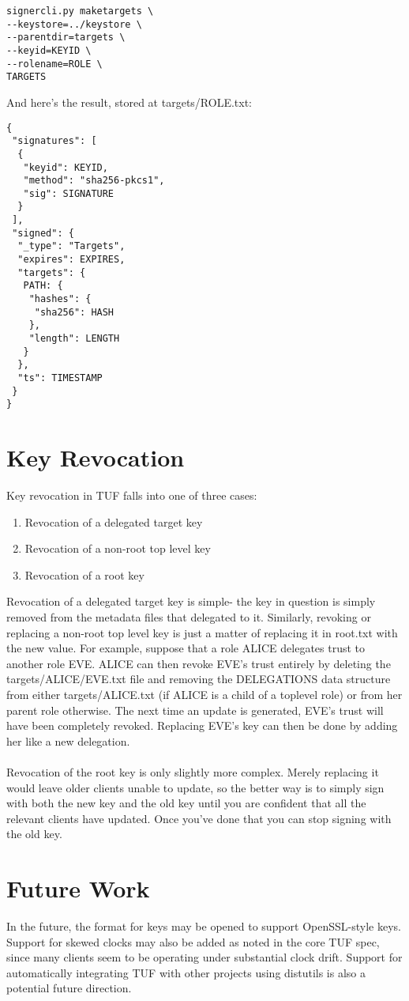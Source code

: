 \documentclass{letter}
\begin{document}
\begin{lstlisting}
signercli.py maketargets \
--keystore=../keystore \
--parentdir=targets \
--keyid=KEYID \
--rolename=ROLE \
TARGETS
\end{lstlisting}

And here's the result, stored at targets/ROLE.txt:

\begin{verbatim}
{
 "signatures": [
  {
   "keyid": KEYID, 
   "method": "sha256-pkcs1", 
   "sig": SIGNATURE
  }
 ], 
 "signed": {
  "_type": "Targets", 
  "expires": EXPIRES, 
  "targets": {
   PATH: {
    "hashes": {
     "sha256": HASH
    }, 
    "length": LENGTH
   }
  }, 
  "ts": TIMESTAMP
 }
}
\end{verbatim}

\section{Key Revocation}
Key revocation in TUF falls into one of three cases:

\begin{enumerate}
        \item Revocation of a delegated target key
        \item Revocation of a non-root top level key
        \item Revocation of a root key
\end{enumerate}

Revocation of a delegated target key is simple- the key in question is simply
removed from the metadata files that delegated to it. Similarly, revoking or
replacing a non-root top level key is just a matter of replacing it in root.txt
with the new value. For example, suppose that a role ALICE delegates trust to
another role EVE. ALICE can then revoke EVE's trust entirely by deleting the
targets/ALICE/EVE.txt file and removing the DELEGATIONS data structure from
either targets/ALICE.txt (if ALICE is a child of a toplevel role) or from her
parent role otherwise. The next time an update is generated, EVE's trust will
have been completely revoked. Replacing EVE's key can then be done by adding her
like a new delegation.
\\\\
Revocation of the root key is only slightly more complex. Merely replacing it would 
leave older clients unable to update, so the better way is to simply sign with 
both the new key and the old key until you are confident that all the relevant clients 
have updated. Once you've done that you can stop signing with the old key. 

\section{Future Work}
In the future, the format for keys may be opened to support OpenSSL-style keys.
Support for skewed clocks may also be added as noted in the core TUF spec, since
many clients seem to be operating under substantial clock drift. Support for
automatically integrating TUF with other projects using distutils is also a
potential future direction.
\end{document}
